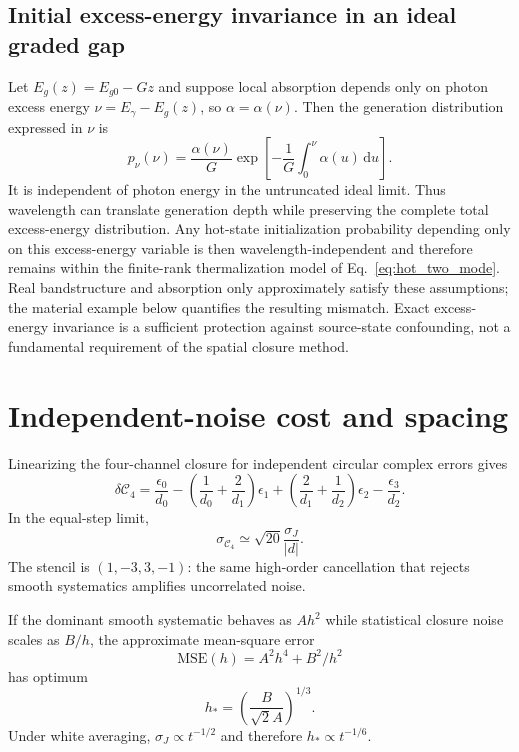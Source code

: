 \documentclass[11pt]{article}
\newcommand{\Cfour}{\mathcal{C}_4}
\newcommand{\dd}{\mathrm{d}}
\begin{document}
\subsection{Initial excess-energy invariance in an ideal graded gap}

Let $E_g(z)=E_{g0}-Gz$ and suppose local absorption depends only on photon excess energy $\nu=E_\gamma-E_g(z)$, so $\alpha=\alpha(\nu)$. Then the generation distribution expressed in $\nu$ is
\begin{equation}
\boxed{
p_\nu(\nu)
=\frac{\alpha(\nu)}{G}
\exp\left[-\frac{1}{G}\int_0^\nu\alpha(u)\,\dd u\right].}
\label{eq:energyinvariance}
\end{equation}
It is independent of photon energy in the untruncated ideal limit. Thus wavelength can translate generation depth while preserving the complete total excess-energy distribution. Any hot-state initialization probability depending only on this excess-energy variable is then wavelength-independent and therefore remains within the finite-rank thermalization model of Eq.~\eqref{eq:hot_two_mode}. Real bandstructure and absorption only approximately satisfy these assumptions; the material example below quantifies the resulting mismatch. Exact excess-energy invariance is a sufficient protection against source-state confounding, not a fundamental requirement of the spatial closure method.

\section{Independent-noise cost and spacing}

Linearizing the four-channel closure for independent circular complex errors gives
\begin{equation}
\delta\Cfour
=\frac{\epsilon_0}{d_0}
-\left(\frac1{d_0}+\frac2{d_1}\right)\epsilon_1
+\left(\frac2{d_1}+\frac1{d_2}\right)\epsilon_2
-\frac{\epsilon_3}{d_2}.
\end{equation}
In the equal-step limit,
\begin{equation}
\boxed{
\sigma_{\Cfour}\simeq\sqrt{20}\frac{\sigma_J}{|d|}.}
\label{eq:fournoise}
\end{equation}
The stencil is $(1,-3,3,-1)$: the same high-order cancellation that rejects smooth systematics amplifies uncorrelated noise.

If the dominant smooth systematic behaves as $Ah^2$ while statistical closure noise scales as $B/h$, the approximate mean-square error
\begin{equation}
\mathrm{MSE}(h)=A^2h^4+B^2/h^2
\end{equation}
has optimum
\begin{equation}
\boxed{h_*=\left(\frac{B}{\sqrt2A}\right)^{1/3}.}
\label{eq:hopt}
\end{equation}
Under white averaging, $\sigma_J\propto t^{-1/2}$ and therefore $h_*\propto t^{-1/6}$.
\end{document}
